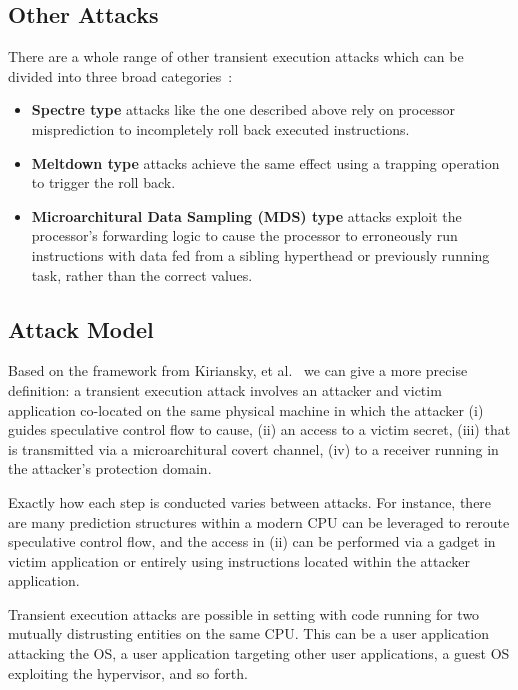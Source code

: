 \subsection{Other Attacks}
There are a whole range of other transient execution attacks which can be divided into three broad categories~\cite{hill:survey}:
\begin{itemize}
\item \textbf{Spectre type} attacks like the one described above rely on processor misprediction to incompletely roll back executed instructions.
\item \textbf{Meltdown type} attacks achieve the same effect using a trapping operation to trigger the roll back.
\item \textbf{Microarchitural Data Sampling (MDS) type} attacks exploit the processor's forwarding logic to cause the processor to erroneously run instructions with data fed from a sibling hyperthead or previously running task, rather than the correct values.
\end{itemize}

\subsection{Attack Model}
Based on the framework from Kiriansky, et al.~\cite{kiriansky:dawg} we can give a more precise definition: a transient execution attack involves an attacker and victim application co-located on the same physical machine in which the attacker (i) guides speculative control flow to cause, (ii) an access to a victim secret, (iii) that is transmitted via a microarchitural covert channel, (iv) to a receiver running in the attacker's protection domain. 

Exactly how each step is conducted varies between attacks.
For instance, there are many prediction structures within a modern CPU can be leveraged to reroute speculative control flow, and the access in (ii) can be performed via a gadget in victim application or entirely using instructions located within the attacker application.

Transient execution attacks are possible in setting with code running for two mutually distrusting entities on the same CPU.
This can be a user application attacking the OS, a user application targeting other user applications, a guest OS exploiting the hypervisor, and so forth.



